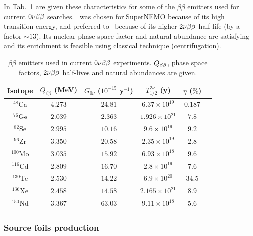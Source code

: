 In Tab.~\ref{tab:bb_isotopes} are given these characteristics for some of the $\beta\beta$ emitters used for current $0\nu\beta\beta$ searches.
\Se\ was chosen for SuperNEMO because of its high transition energy, and preferred to \Mo\ because of its higher $2\nu\beta\beta$ half-life (by a factor $\sim13$).
Its nuclear phase space factor and natural abundance are satisfying and its enrichment is feasible using classical technique (centrifugation).
\begin{table}[h!]
\centering
\begin{tabular}{|c|c|c|c|c|c|}
\hline
Isotope & $Q_{\beta\beta}$ (MeV) & $G_{0\nu}$ ($10^{-15}$ y$^{-1}$) & $T^{2\nu}_{1/2}$ (y) & $\eta$ ($\%$) \\
\hline
\hline
$^{48}$Ca & $4.273$ & $24.81$ & $6.37\times 10^{19}$ & $0.187$ \\
$^{76}$Ge & $2.039$ & $2.363$ & $1.926\times 10^{21}$ & $7.8$ \\
$^{82}$Se & $2.995$ & $10.16$ & $9.6\times 10^{19}$ & $9.2$ \\
$^{96}$Zr & $3.350$ & $20.58$ & $2.35\times 10^{19}$ & $2.8$ \\
$^{100}$Mo & $3.035$ & $15.92$ & $6.93\times 10^{18}$ & $9.6$ \\
$^{116}$Cd & $2.809$ & $16.70$ & $2.8\times 10^{19}$ & $7.6$ \\
$^{130}$Te & $2.530$ & $14.22$ & $6.9\times 10^{20}$ & $34.5$ \\
$^{136}$Xe & $2.458$ & $14.58$ & $2.165\times 10^{21}$ & $8.9$ \\
$^{150}$Nd & $3.367$ & $63.03$ & $9.11\times 10^{18}$ & $5.6$ \\
\hline
\end{tabular}
\caption{$\beta\beta$ emitters used in current $0\nu\beta\beta$ experiments.
$Q_{\beta\beta}$, phase space factors, $2\nu\beta\beta$ half-lives and natural abundances are given.
\label{tab:bb_isotopes}}
\end{table}

\subsubsection*{Source foils production}

